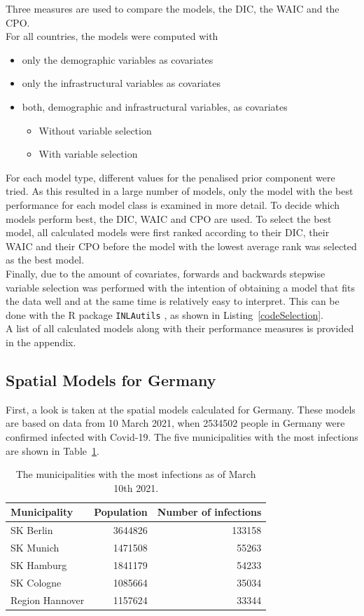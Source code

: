 Three measures are used to compare the models, the DIC, the WAIC and the CPO. \\
For all countries, the models were computed with
\begin{itemize}
    \item[1.] only the demographic variables as covariates
    \item[2.] only the infrastructural variables as covariates
    \item[3.] both, demographic and infrastructural variables, as covariates
    \begin{itemize}
        \item[3.1] Without variable selection
        \item[3.2] With variable selection
    \end{itemize}
\end{itemize}
For each model type, different values for the penalised prior component were tried. As this resulted in a large number of models, only the model with the best performance for each model class is examined in more detail. To decide which models perform best, the DIC, WAIC and CPO are used. To select the best model, all calculated models were first ranked according to their DIC, their WAIC and their CPO before the model with the lowest average rank was selected as the best model. \\
Finally, due to the amount of covariates, forwards and backwards stepwise variable selection was performed with the intention of obtaining a model that fits the data well and at the same time is relatively easy to interpret. This can be done with the R package \texttt{INLAutils} \cite{inlautils}, as shown in Listing~\ref{codeSelection}. \\
A list of all calculated models along with their performance measures is provided in the appendix.
\subsection{Spatial Models for Germany}
First, a look is taken at the spatial models calculated for Germany. These models are based on data from 10 March 2021, when 2534502 people in Germany were confirmed infected with Covid-19. The five municipalities with the most infections are shown in Table~\ref{top5germany}.
\begin{table}[H] 
\caption{The municipalities with the most infections as of March 10th 2021. \label{top5germany}}
\begin{tabular}{l r r}
\toprule
\textbf{Municipality}	& \textbf{Population}	& \textbf{Number of infections} \\
\midrule
SK Berlin & 3644826 & 133158 \\     
SK Munich & 1471508 & 55263 \\
SK Hamburg & 1841179 & 54233 \\
SK Cologne & 1085664 & 35034 \\
Region Hannover & 1157624 & 33344 \\
\bottomrule
\end{tabular}
\end{table}
